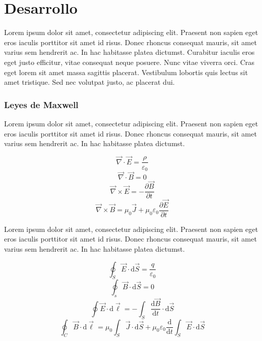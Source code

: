 \documentclass[12pt]{article}
\begin{document}
\section{Desarrollo}

Lorem ipsum dolor sit amet, consectetur adipiscing elit. Praesent non sapien eget eros iaculis porttitor sit amet id risus. Donec rhoncus consequat mauris, sit amet varius sem hendrerit ac. In hac habitasse platea dictumst. Curabitur iaculis eros eget justo efficitur, vitae consequat neque posuere. Nunc vitae viverra orci. Cras eget lorem sit amet massa sagittis placerat. Vestibulum lobortis quis lectus sit amet tristique. Sed nec volutpat justo, ac placerat dui. 

\subsubsection{Leyes de Maxwell}

Lorem ipsum dolor sit amet, consectetur adipiscing elit. Praesent non sapien eget eros iaculis porttitor sit amet id risus. Donec rhoncus consequat mauris, sit amet varius sem hendrerit ac. In hac habitasse platea dictumst.

\begin{equation}
    \vec{\nabla} \cdot \vec{E}=\frac{\rho}{\varepsilon_{0}}
\end{equation}
\begin{equation}
    \vec{\nabla} \cdot \vec{B}=0
\end{equation}
\begin{equation}
    \vec{\nabla} \times \vec{E}=-\frac{\partial \vec{B}}{\partial t}
\end{equation}
\begin{equation}
    \vec{\nabla} \times \vec{B}=\mu_{0} \vec{J}+\mu_{0} \varepsilon_{0} \frac{\partial \vec{E}}{\partial t}
\end{equation}

Lorem ipsum dolor sit amet, consectetur adipiscing elit. Praesent non sapien eget eros iaculis porttitor sit amet id risus. Donec rhoncus consequat mauris, sit amet varius sem hendrerit ac. In hac habitasse platea dictumst.

\begin{equation}
    \oint_{S} \vec{E} \cdot \mathrm{d} \vec{S}=\frac{q}{\varepsilon_{0}}
\end{equation}
\begin{equation}
    \oint_{s} \vec{B} \cdot \mathrm{d} \vec{S}=0
\end{equation}
\begin{equation}
    \oint \vec{E} \cdot \mathrm{d} \vec{\ell}=-\int_{S} \frac{\mathrm{d} \vec{B}}{\mathrm{d} t} \cdot \mathrm{d} \vec{S}
\end{equation}
\begin{equation}
    \oint_{C} \vec{B} \cdot \mathrm{d} \vec{\ell}=\mu_{0} \int_{S} \vec{J} \cdot \mathrm{d} \vec{S}+\mu_{0} \varepsilon_{0} \frac{\mathrm{d}}{\mathrm{d} t} \int_{S} \vec{E} \cdot \mathrm{d} \vec{S}
\end{equation}
\end{document}
